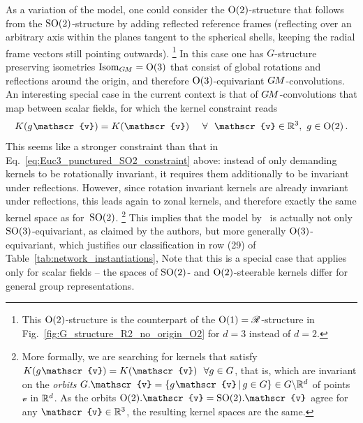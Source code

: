 As a variation of the model, one could consider the $\operatorname{O}(2)$-structure that follows from the $\operatorname{SO}(2)$-structure by adding reflected reference frames (reflecting over an arbitrary axis within the planes tangent to the spherical shells, keeping the radial frame vectors still pointing outwards).%
\footnote{
    This $\operatorname{O}(2)$-structure is the counterpart of the $\operatorname{O}(1) = \mathscr{R}$-structure in Fig.~\ref{fig:G_structure_R2_no_origin_O2} for $d=3$ instead of $d=2$.
}
In this case one has $G$-structure preserving isometries $\operatorname{Isom}_{G\mkern-1.4muM} = \operatorname{O}(3)$ that consist of global rotations and reflections around the origin, and therefore $\operatorname{O}(3)$-equivariant $G\mkern-1.4muM$-convolutions.
An interesting special case in the current context is that of $G\mkern-1.4muM$-convolutions that map between scalar fields, for which the kernel constraint reads
\begin{align}\label{eq:Euc3_punctured_O2_constraint}
    K(g\mkern1mu \mathscr{v}) = K(\mathscr{v}) \quad\ \forall\ \ \mathscr{v}\in\R^3,\ g\in\O2 \,.
\end{align}
This seems like a stronger constraint than that in Eq.~\eqref{eq:Euc3_punctured_SO2_constraint} above:
instead of only demanding kernels to be rotationally invariant, it requires them additionally to be invariant under reflections.
However, since rotation invariant kernels are already invariant under reflections, this leads again to zonal kernels, and therefore exactly the same kernel space as for~$\operatorname{SO}(2)$.%
\footnote{
    More formally, we are searching for kernels that satisfy $K(g\mkern1mu \mathscr{v}) = K(\mathscr{v})\ \ \forall g\in G$, that is, which are invariant on the \emph{orbits} $G.\mathscr{v} = \{g\mkern1mu \mathscr{v} \,|\, g\in G\} \in G \backslash \R^d$ of points $\mathscr{v}$ in $\mathbb{R}^d$.
    As the orbits $\O2.\mathscr{v} = \SO2.\mathscr{v}$ agree for any $\mathscr{v}\in\R^3$, the resulting kernel spaces are the same.
}
This implies that the model by~\citet{ramasinghe2019representation} is actually not only $\operatorname{SO}(3)$-equivariant, as claimed by the authors, but more generally $\operatorname{O}(3)$-equivariant, which justifies our classification in row (29) of Table~\ref{tab:network_instantiations},
Note that this is a special case that applies only for scalar fields -- the spaces of $\operatorname{SO}(2)$- and $\operatorname{O}(2)$-steerable kernels differ for general group representations.


